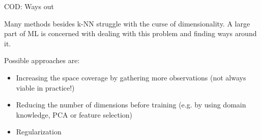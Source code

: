 \documentclass[11pt,compress,t,notes=noshow, xcolor=table]{beamer}
\begin{document}
\begin{vbframe}{COD: Ways out}

Many methods besides k-NN struggle with the curse of dimensionality. A large part of ML is concerned with dealing with this problem and finding ways around it.

\medskip

Possible approaches are:
\begin{itemize}
\item Increasing the space coverage by gathering more observations (not always viable in practice!)
\item Reducing the number of dimensions before training (e.g. by using domain knowledge, PCA or feature selection)
\item Regularization
\end{itemize}


\end{vbframe}


\endlecture
\end{document}
